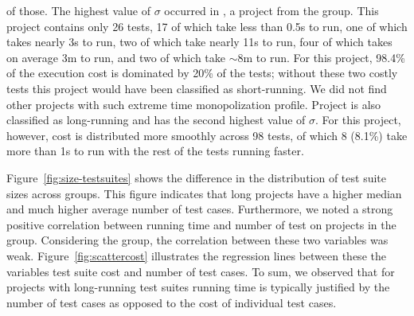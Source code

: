 of those. The highest value of $\sigma$ occurred in
, a project from the \longg{} group.
This project contains only 26 tests, 17 of which take less than 0.5s
to run, one of which takes nearly 3s to run, two of which take nearly
11s to run, four of which takes on average 3m to run, and two of which
take $\sim$8m to run.
For this project, 98.4\% of the execution cost is dominated by 20\% of
the tests; without these two costly tests this project would have been
classified as short-running.
We did not find other projects with such extreme time monopolization
profile.
Project  is also classified as
long-running and has the second highest value of $\sigma$.
For this project, however, cost is distributed more smoothly across 98
tests, of which 8 (8.1\%) take more than 1s to run with the rest of
the tests running faster.

Figure~\ref{fig:size-testsuites} shows the difference in the
distribution of test suite sizes across groups.  This figure indicates
that long projects have a higher median and much higher average
number of test cases.
Furthermore, we noted a strong positive correlation between running
time and number of test on projects in the \longg{} group.
Considering the \medg{} group, the correlation between these two
variables was weak.
Figure~\ref{fig:scattercost} illustrates the regression lines between
these the variables test suite cost and number of test cases.
To sum, we observed that for projects with long-running test suites
running time is typically
justified by the number of test cases as opposed to the cost of individual test cases.


